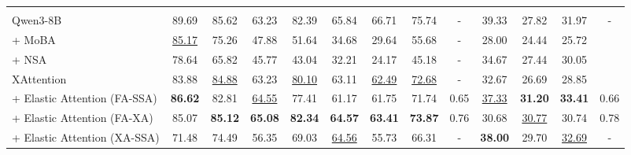 \begin{table}[t]
{\begin{tabular}{l | c c c c c c | c | c | c c | c | c}
\arrayrulecolor{black}\midrule
\rowcolor{blue!25}
\multicolumn{13}{c}{\textbf{Qwen3-8B backbone model}} \\
\arrayrulecolor{black!20}\midrule
Qwen3-8B & 89.69 & 85.62 & 63.23 & 82.39 & 65.84 & 66.71 & 75.74 & - & 39.33 & 27.82 & 31.97 & - \\
+ MoBA & \underline{85.17} & 75.26 & 47.88 & 51.64 & 34.68 & 29.64 & 55.68& - & 28.00 & 24.44 & 25.72 \\
+ NSA & 78.64 & 65.82 & 45.77 & 43.04 & 32.21 & 24.17 & 45.18 &-& 34.67 & 27.44 & 30.05 \\
XAttention & 83.88 & \underline{84.88} & 63.23 & \underline{80.10} & 63.11 & \underline{62.49} & \underline{72.68} & - & 32.67 & 26.69 & 28.85 \\
\arrayrulecolor{black!40}\midrule
+ Elastic Attention (FA-SSA) & \textbf{86.62} & 82.81 & \underline{64.55} & 77.41 & 61.17 & 61.75 & 71.74 & 0.65 & \underline{37.33} & \textbf{31.20} & \textbf{33.41}  & 0.66\\
+ Elastic Attention (FA-XA) & 85.07 & \textbf{85.12} & \textbf{65.08} & \textbf{82.34} & \textbf{64.57} & \textbf{63.41} & \textbf{73.87} & 0.76 & 30.68 & \underline{30.77} & 30.74 & 0.78\\
+ Elastic Attention (XA-SSA) & 71.48 & 74.49 & 56.35 & 69.03 & \underline{64.56} & 55.73 & 66.31 & - & \textbf{38.00} & 29.70 & \underline{32.69} & -\\


\end{tabular}}
\end{table}
